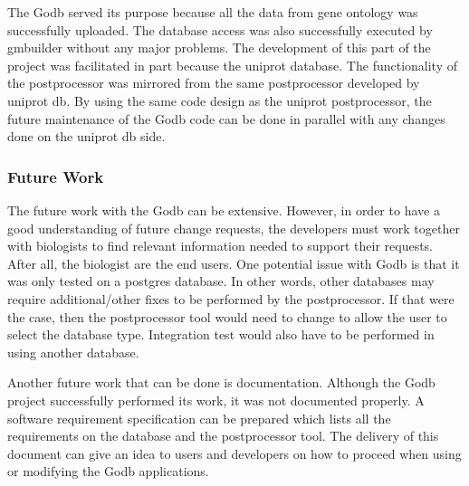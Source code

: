 The Godb served its purpose because all the data from gene ontology was successfully uploaded.  The database access was also
successfully executed by gmbuilder without any major problems.  The development of this part of the project was facilitated
in part because the uniprot database.  The functionality of the postprocessor was mirrored from the same postprocessor
developed by uniprot db.  By using the same code design as the uniprot postprocessor, the future maintenance of the Godb
code can be done in parallel with any changes done on the uniprot db side.

\subsubsection{Future Work}
The future work with the Godb can be extensive.  However, in order to have a good understanding of
future change requests, the developers must work together with biologists to find relevant information needed to support their requests.
After all, the biologist are the end users. One potential issue with  Godb is that it was only tested on a postgres database. In other
words, other databases may require additional/other fixes to be performed by the postprocessor. If that were the case, then
the postprocessor tool would need to change to allow the user to select the database type. Integration test would also have to be performed
in using another database.

Another future work that can be done is
documentation.  Although the Godb project successfully performed its work, it was not documented properly.  A software
requirement specification can be prepared which lists all the requirements on the database and the postprocessor tool.  The
delivery of this document can give an idea to users and developers on how to proceed when using or modifying the Godb
applications.

%
